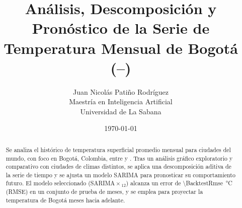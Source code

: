 \documentclass[11pt,a4paper]{article}
\title{Análisis, Descomposición y Pronóstico de la Serie de Temperatura Mensual de Bogotá (\AnalysisStartYear{}--\AnalysisEndYear{})}
\author{Juan Nicolás Patiño Rodríguez \\ \small Maestría en Inteligencia Artificial \\ \small Universidad de La Sabana}
\date{\today}
\begin{document}
\maketitle

\begin{abstract}
Se analiza el histórico de temperatura superficial promedio mensual para \DatasetCityCount{} ciudades del mundo, con foco en Bogotá, Colombia, entre \AnalysisStartYear{} y \AnalysisEndYear{}. Tras un análisis gráfico exploratorio y comparativo con ciudades de climas distintos, se aplica una descomposición aditiva de la serie de tiempo y se ajusta un modelo SARIMA para pronosticar su comportamiento futuro. El modelo seleccionado (SARIMA\SarimaOrder{}\,$\times$\,\SarimaSeasonalOrder{}$_{12}$) alcanza un error de \SI{\BacktestRmse}{\celsius} (RMSE) en un conjunto de prueba de \TestSizeMonths{} meses, y se emplea para proyectar la temperatura de Bogotá \FutureHorizonMonths{} meses hacia adelante.
\end{abstract}











\end{document}
